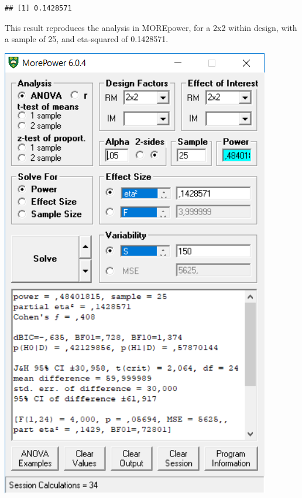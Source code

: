 \documentclass[]{book}
\newenvironment{Shaded}{\begin{snugshade}}{\end{snugshade}}
\newcommand{\DecValTok}[1]{\textcolor[rgb]{0.00,0.00,0.81}{#1}}
\newcommand{\NormalTok}[1]{#1}
\newcommand{\OperatorTok}[1]{\textcolor[rgb]{0.81,0.36,0.00}{\textbf{#1}}}
\begin{document}
\begin{Shaded}
\end{Shaded}

\begin{verbatim}
## [1] 0.1428571
\end{verbatim}

This result reproduces the analysis in MOREpower, for a 2x2 within design, with a sample of 25, and eta-squared of 0.1428571.

\includegraphics{screenshots/morepower_4.png}
\end{document}
